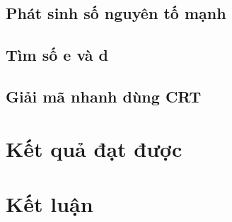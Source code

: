 \documentclass[12pt]{article}
\begin{document}
\subsection{Phát sinh số nguyên tố mạnh}


\subsection{Tìm số e và d}


\subsection{Giải mã nhanh dùng CRT}


\cleardoublepage
\section{Kết quả đạt được}


\cleardoublepage
\section{Kết luận}



\newpage\cleardoublepage
\nocite{*}
\newpage\cleardoublepage

\end{document}
